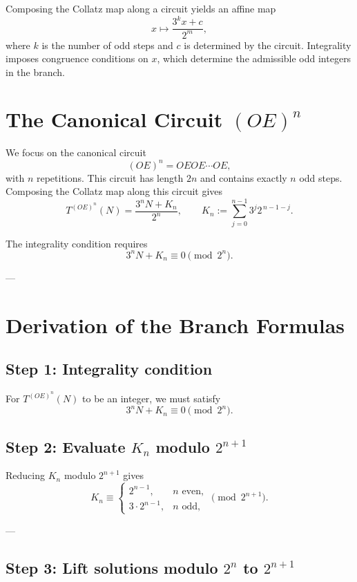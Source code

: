 \documentclass[12pt]{article}
\begin{document}
Composing the Collatz map along a circuit yields an affine map
\[
x \longmapsto \frac{3^k x + c}{2^m},
\]
where \(k\) is the number of odd steps and \(c\) is determined by the circuit.
Integrality imposes congruence conditions on \(x\), which determine the
admissible odd integers in the branch.

\section{The Canonical Circuit \((OE)^n\)}

We focus on the canonical circuit
\[
(OE)^n = OEOE\cdots OE,
\]
with \(n\) repetitions. This circuit has length \(2n\) and contains exactly
\(n\) odd steps. Composing the Collatz map along this circuit gives
\[
T^{(OE)^n}(N) = \frac{3^n N + K_n}{2^n}, \qquad 
K_n := \sum_{j=0}^{n-1} 3^j 2^{\,n-1-j}.
\]

The integrality condition requires
\[
3^n N + K_n \equiv 0 \pmod{2^n}.
\]

---

\section{Derivation of the Branch Formulas}

\subsection*{Step 1: Integrality condition}

For \(T^{(OE)^n}(N)\) to be an integer, we must satisfy
\[
3^n N + K_n \equiv 0 \pmod{2^n}.
\]

\subsection*{Step 2: Evaluate \(K_n\) modulo \(2^{n+1}\)}

Reducing \(K_n\) modulo \(2^{n+1}\) gives
\[
K_n \equiv
\begin{cases}
2^{n-1}, & n \text{ even},\\[1mm]
3 \cdot 2^{n-1}, & n \text{ odd},
\end{cases}
\pmod{2^{n+1}}.
\]

---

\subsection*{Step 3: Lift solutions modulo \(2^n\) to \(2^{n+1}\)}
\end{document}
